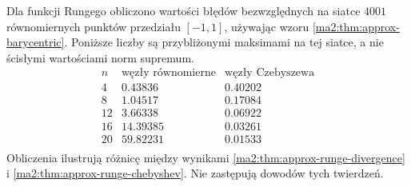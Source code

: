 \begin{przyklad}
\label{ma2:ex:approx-runge-table}
Dla funkcji Rungego obliczono wartości błędów
bezwzględnych na siatce $4001$ równomiernych
punktów przedziału $[-1,1]$, używając wzoru
\ref{ma2:thm:approx-barycentric}.
Poniższe liczby są przybliżonymi maksimami
na tej siatce, a nie ścisłymi wartościami
norm supremum.
\[
 \begin{array}{c|r|r}
 n & \text{węzły równomierne} & \text{węzły Czebyszewa}\\ \hline
 4 & 0.43836 & 0.40202\\
 8 & 1.04517 & 0.17084\\
 12 & 3.66338 & 0.06922\\
 16 & 14.39385 & 0.03261\\
 20 & 59.82231 & 0.01533\\
 \end{array}
\]
Obliczenia ilustrują różnicę między wynikami
\ref{ma2:thm:approx-runge-divergence}
i \ref{ma2:thm:approx-runge-chebyshev}.
Nie zastępują dowodów tych twierdzeń.
\end{przyklad}
